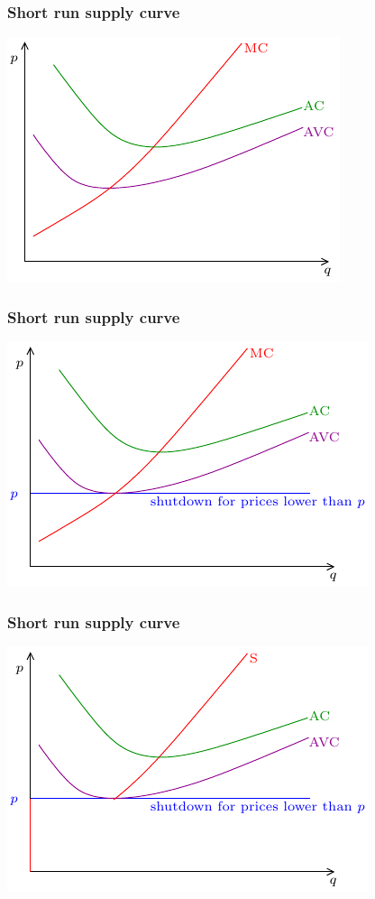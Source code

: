 \documentclass[xcolor=pdftex,dvipsnames]{beamer}
\begin{document}
\begin{frame}\frametitle{Short run supply curve}
\begin{center}
\includegraphics{pics/Supply1}
\end{center}

\end{frame}

\begin{frame}\frametitle{Short run supply curve}
\begin{center}
\includegraphics{pics/Supply2}
\end{center}

\end{frame}

\begin{frame}\frametitle{Short run supply curve}
\begin{center}
\includegraphics{pics/Supply3}
\end{center}

\end{frame}
\end{document}
